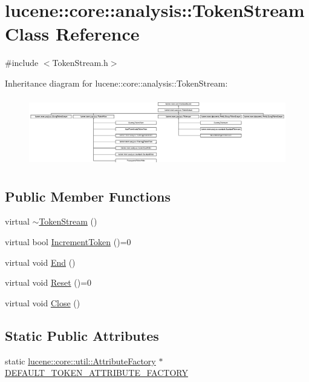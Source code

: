 \hypertarget{classlucene_1_1core_1_1analysis_1_1TokenStream}{}\section{lucene\+:\+:core\+:\+:analysis\+:\+:Token\+Stream Class Reference}
\label{classlucene_1_1core_1_1analysis_1_1TokenStream}


{\ttfamily \#include $<$Token\+Stream.\+h$>$}

Inheritance diagram for lucene\+:\+:core\+:\+:analysis\+:\+:Token\+Stream\+:\begin{figure}[H]
\begin{center}
\leavevmode
\includegraphics[height=3.020496cm]{classlucene_1_1core_1_1analysis_1_1TokenStream}
\end{center}
\end{figure}
\subsection*{Public Member Functions}
\begin{DoxyCompactItemize}
\item 
virtual \mbox{\hyperlink{classlucene_1_1core_1_1analysis_1_1TokenStream_a16519782e35e74b26236c729c6b94f8c}{$\sim$\+Token\+Stream}} ()
\item 
virtual bool \mbox{\hyperlink{classlucene_1_1core_1_1analysis_1_1TokenStream_a614d4ea24a354d6f4354b4941b5124e2}{Increment\+Token}} ()=0
\item 
virtual void \mbox{\hyperlink{classlucene_1_1core_1_1analysis_1_1TokenStream_a4693985ca7fb242412049a074027b8b5}{End}} ()
\item 
virtual void \mbox{\hyperlink{classlucene_1_1core_1_1analysis_1_1TokenStream_ae24622f4bc0aeaf0bef924ff1661e023}{Reset}} ()=0
\item 
virtual void \mbox{\hyperlink{classlucene_1_1core_1_1analysis_1_1TokenStream_ad7963391ddbb2c75610e3738ba5155c8}{Close}} ()
\end{DoxyCompactItemize}
\subsection*{Static Public Attributes}
\begin{DoxyCompactItemize}
\item 
static \mbox{\hyperlink{classlucene_1_1core_1_1util_1_1AttributeFactory}{lucene\+::core\+::util\+::\+Attribute\+Factory}} $\ast$ \mbox{\hyperlink{classlucene_1_1core_1_1analysis_1_1TokenStream_a3a38785c7907943994326cb9d7180671}{D\+E\+F\+A\+U\+L\+T\+\_\+\+T\+O\+K\+E\+N\+\_\+\+A\+T\+T\+R\+I\+B\+U\+T\+E\+\_\+\+F\+A\+C\+T\+O\+RY}}
\end{DoxyCompactItemize}
